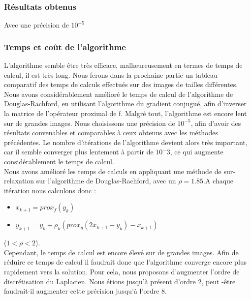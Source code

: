 \subsubsection{Résultats obtenus}
Avec une précision de $10^{-5}$

\subsubsection{Temps et coût de l'algorithme}
L'algorithme semble être très efficace, malheureusement en termes de temps de calcul, il est très long. Nous ferons dans la prochaine partie un tableau comparatif des temps de calculs effectués sur des images de tailles différentes.\\
Nous avons considérablement amélioré  le temps de calcul de l'algorithme de Douglas-Rachford, en utilisant l'algorithme du gradient conjugué, afin d'inverser la matrice de l'opérateur proximal de f. Malgré tout, l'algorithme est encore lent sur de grandes images. Nous choisissons une précision de $10^{-5}$, afin d'avoir des résultats convenables et comparables à ceux obtenus avec les méthodes précédentes. Le nombre d'itérations de l'algorithme devient alors très important, car il semble converger plus lentement à partir de $10^-3$, ce qui augmente considérablement le temps de calcul.\\
Nous avons amélioré les temps de calculs en appliquant une méthode de sur-relaxation sur l'algorithme de Douglas-Rachford, avec un $\rho  =1.85$.A chaque itération nous calculons donc :
\begin{center} 
\begin{itemize}
\item $x_{k+1} = prox_f(y_k)$
\item $y_{k+1} = y_k+\rho_k(prox_g(2x_{k+1}-y_k)-x_{k+1})$
\end{itemize}
\end{center}
($1<\rho<2$).\\
Cependant, le temps de calcul est encore élevé sur de grandes images.
Afin de réduire ce temps de calcul il faudrait donc que l'algorithme converge encore plus rapidement vers la solution. Pour cela, nous proposons d'augmenter l'ordre de discrétisation du Laplacien. Nous étions jusqu'à présent d'ordre 2, peut -être faudrait-il augmenter cette précision jusqu'à l'ordre 8.
